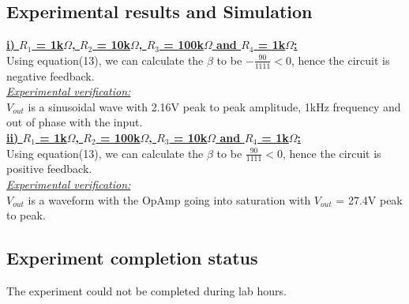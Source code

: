 \documentclass[12pt]{article}
\begin{document}


\subsection{Experimental results and Simulation}
\underline{\textbf{i) ${R_{1}}$ = 1k$\Omega$, $R_{2}$ = 10k$\Omega$, $R_{3}$ = 100k$\Omega$ and $R_{4}$ = 1k$\Omega$:}}\\
Using equation(13), we can calculate the $\beta$ to be $- \frac{90}{1111} < 0$, hence the circuit is negative feedback.\\
\!\!\!\!\!\!\!\!\!\underline{\textit{Experimental verification:}}\\
$V_{out}$ is a sinusoidal wave with 2.16V peak to peak amplitude, 1kHz frequency and out of phase with the input.\\

\!\!\!\!\!\!\!\!\!\underline{\textbf{ii) ${R_{1}}$ = 1k$\Omega$, $R_{2}$ = 100k$\Omega$, $R_{3}$ = 10k$\Omega$ and $R_{4}$ = 1k$\Omega$:}}\\
Using equation(13), we can calculate the $\beta$ to be $\frac{90}{1111} < 0$, hence the circuit is positive feedback.\\
\!\!\!\!\!\!\!\!\!\underline{\textit{Experimental verification:}}\\
$V_{out}$ is a waveform with the OpAmp going into saturation with $V_{out}$ = 27.4V peak to peak.\\


\subsection{Experiment completion status}
The experiment could not be completed during lab hours.
\end{document}
